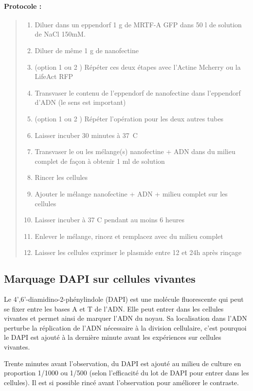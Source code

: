 \paragraph{Protocole : }
\begin{quote}
\begin{enumerate}
	\item Diluer dans un eppendorf 1 \micro g de MRTF-A GFP dans 50 \micro l de solution de NaCl 150mM. 
	\item Diluer de même 1 \micro g de nanofectine
	\item (option 1 ou 2 ) Répéter ces deux étapes avec l'Actine Mcherry ou la LifeAct RFP
	\item Transvaser le contenu de l'eppendorf de nanofectine dans l'eppendorf d'ADN (le sens est important)
	\item (option 1 ou 2 ) Répéter l'opération pour les deux autres tubes
	\item Laisser incuber 30 minutes à 37~\degres C 
	\item Transvaser le ou les mélange(s) nanofectine + ADN dans du milieu complet de façon à obtenir 1  ml de solution
	\item Rincer les cellules
	\item Ajouter le mélange nanofectine + ADN + milieu complet sur les cellules
	\item Laisser incuber à 37 \degres C pendant au moins 6 heures
	\item Enlever le mélange, rincez et remplacez avec du milieu complet
	\item Laisser les cellules exprimer le plasmide entre 12 et 24h après rinçage
\end{enumerate}
\end{quote}

	\subsection{Marquage DAPI sur cellules vivantes}
	
	Le  4',6'-diamidino-2-phénylindole (DAPI) est une molécule fluorescente qui peut se fixer entre les bases A et T de l'ADN. Elle peut entrer dans les cellules vivantes et permet ainsi de marquer l'ADN du noyau. Sa localisation dans l'ADN perturbe la réplication de l'ADN nécessaire à la division cellulaire, c'est pourquoi le DAPI est ajouté à la dernière minute avant les expériences sur cellules vivantes. 
	
	Trente minutes avant l'observation, du DAPI est ajouté au milieu de culture en proportion 1/1000 ou 1/500 (selon l'efficacité du lot de DAPI pour entrer dans les cellules). Il est si possible rincé avant l'observation pour améliorer le contraste. 
